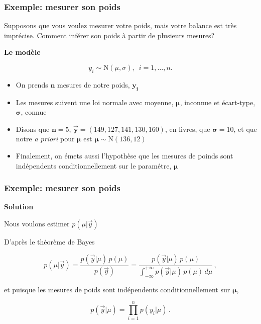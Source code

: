\documentclass{beamer}
\begin{document}
\begin{frame}
    \frametitle{Exemple: mesurer son poids}
    Supposons que vous voulez mesurer votre poids, mais votre balance
    est très imprécise. Comment inférer son poids à partir de plusieurs mesures?

    \pause

    \vfill

    \textbf{Le modèle}

    \[y_i \sim \textrm{N}(\mu, \sigma), \, \, \, i = 1, \ldots, n.\]

    \pause

    \begin{itemize}
      \item On prends $\boldsymbol{n}$ mesures de notre poids, $\boldsymbol{y_i}$
      \pause
      \item Les mesures suivent une loi normale avec moyenne, $\boldsymbol{\mu}$,
            inconnue et écart-type, $\boldsymbol{\sigma}$, connue
      \pause
      \item Disons que $\boldsymbol{n} = 5$, $\boldsymbol{\vec{y}} = (149, 127, 141, 130, 160)$, en livres,
            que $\boldsymbol{\sigma} = 10$, et que notre \emph{a priori} pour $\boldsymbol{\mu}$
            est $\boldsymbol{\mu} \sim \textrm{N}(136, 12)$
      \pause
      \item Finalement, on émets aussi l'hypothèse que les mesures de poinds sont indépendents
            conditionnellement sur le paramétre, $\boldsymbol{\mu}$
    \end{itemize}
\end{frame}


\begin{frame}
    \frametitle{Exemple: mesurer son poids}
    \textbf{Solution}

    \vfill

    Nous voulons estimer $p(\mu | \vec{y})$

    \pause

    \vfill

    D'après le théorème de Bayes

    \[p(\mu | \vec{y}) = \frac{p(\vec{y} | \mu) \, p(\mu)}{p(\vec{y})} 
      = \frac{p(\vec{y} | \mu) \, p(\mu)}{\int_{-\infty}^{+\infty} p(\vec{y} | \mu) \, p(\mu) \, d\mu} \, ,\]

    \pause

    et puisque les mesures de poids sont indépendents conditionnellement sur $\boldsymbol{\mu}$,

    \[p(\vec{y} | \mu) = \prod_{i=1}^{n} p(y_i | \mu) \, .\]
\end{frame}
\end{document}
